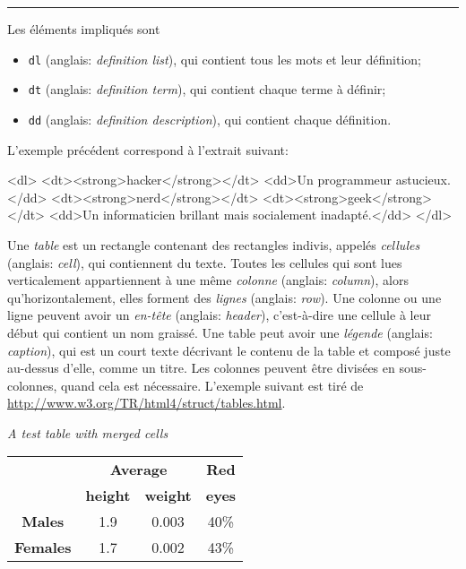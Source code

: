\noindent\rule{\linewidth}{0.5pt}
Les éléments impliqués sont
\begin{itemize}

  \item \texttt{dl} (anglais: \emph{definition list}), qui contient
   tous les mots et leur définition;

  \item \texttt{dt} (anglais: \emph{definition term}), qui contient
   chaque terme à définir;

  \item \texttt{dd} (anglais: \emph{definition description}), qui
    contient chaque définition.

\end{itemize}
L'exemple précédent correspond à l'extrait \HTML suivant:
\begin{sverb}
<dl>
  <dt><strong>hacker</strong></dt>
    <dd>Un programmeur astucieux.</dd>
  <dt><strong>nerd</strong></dt>
  <dt><strong>geek</strong></dt>
    <dd>Un informaticien brillant mais socialement inadapté.</dd>
</dl>
\end{sverb}
Une \emph{table} est un rectangle contenant des rectangles indivis,
appelés \emph{cellules} (anglais: \emph{cell}), qui contiennent du
texte. Toutes les cellules qui sont lues verticalement appartiennent à
une même \emph{colonne} (anglais: \emph{column}), alors
qu'horizontalement, elles forment des \emph{lignes} (anglais:
\emph{row}). Une colonne ou une ligne peuvent avoir un \emph{en-tête}
(anglais: \emph{header}), c'est-à-dire une cellule à leur début qui
contient un nom graissé. Une table peut avoir une \emph{légende}
(anglais: \emph{caption}), qui est un court texte décrivant le contenu
de la table et composé juste au-dessus d'elle, comme un titre. Les
colonnes peuvent être divisées en sous-colonnes, quand cela est
nécessaire. L'exemple suivant est tiré de
\url{http://www.w3.org/TR/html4/struct/tables.html}.
\begin{center}
\emph{A test table with merged cells}\\

\begin{tabular}{|c|c|c|c|}
\hline
                 & \multicolumn{2}{|c|}{\textbf{Average}} & \textbf{Red}\\
\cline{2-3}
                 & \textbf{height}    &   \textbf{weight} & \textbf{eyes}\\
\hline
\textbf{Males}   & 1.9                & 0.003             & 40\%\\
\hline
\textbf{Females} & 1.7                & 0.002             & 43\%\\
\hline
\end{tabular}
\end{center}
